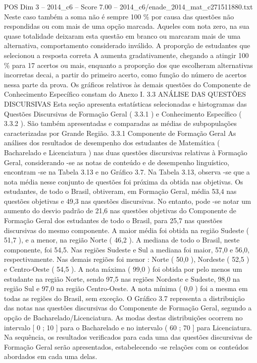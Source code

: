 \begin{textsample}{POS Dim 3 – 2014\_c6 – Score 7.00 – 2014\_c6/enade\_2014\_mat\_c271511880.txt}
Neste caso também a soma não é sempre 100 \% por causa das questões não respondidas ou com mais de uma opção marcada.
Aqueles com nota zero, na sua quase totalidade deixaram esta questão em branco ou marcaram mais de uma alternativa, comportamento considerado inválido.
A proporção de estudantes que selecionou a resposta correta A aumenta gradativamente, chegando a atingir 100 \% para 17 acertos ou mais, enquanto a proporção dos que escolheram alternativas incorretas decai, a partir do primeiro acerto, como função do número de acertos nessa parte da prova.
Os gráficos relativos às demais questões do Componente de Conhecimento Específico constam do Anexo I. 3.3 ANÁLISE DAS QUESTÕES DISCURSIVAS Esta seção apresenta estatísticas selecionadas e histogramas das Questões Discursivas de Formação Geral ( 3.3.1 ) e Conhecimento Específico ( 3.3.2 ).
São também apresentadas e comparadas as médias de subpopulações caracterizadas por Grande Região. 3.3.1 Componente de Formação Geral As análises dos resultados de desempenho dos estudantes de Matemática ( Bacharelado e Licenciatura ) nas duas questões discursivas relativas à Formação Geral, considerando -se as notas de conteúdo e de desempenho linguístico, encontram -se na Tabela 3.13 e no Gráfico 3.7.
Na Tabela 3.13, observa -se que a nota média nesse conjunto de questões foi próxima da obtida nas objetivas.
Os estudantes, de todo o Brasil, obtiveram, em Formação Geral, média 53,4 nas questões objetivas e 49,3 nas questões discursivas.
No entanto, pode -se notar um aumento do desvio padrão de 21,6 nas questões objetivas do Componente de Formação Geral dos estudantes de todo o Brasil, para 25,7 nas questões discursivas do mesmo componente.
A maior média foi obtida na região Sudeste ( 51,7 ), e a menor, na região Norte ( 46,2 ).
A mediana de todo o Brasil, neste componente, foi 54,5.
Nas regiões Sudeste e Sul a mediana foi maior, 57,0 e 56,0, respectivamente.
Nas demais regiões foi menor : Norte ( 50,0 ), Nordeste ( 52,5 ) e Centro-Oeste ( 54,5 ).
A nota máxima ( 99,0 ) foi obtida por pelo menos um estudante na região Norte, sendo 97,5 nas regiões Nordeste e Sudeste, 98,0 na região Sul e 97,0 na região Centro-Oeste.
A nota mínima ( 0,0 ) foi a mesma em todas as regiões do Brasil, sem exceção.
O Gráfico 3.7 representa a distribuição das notas nas questões discursivas do Componente de Formação Geral, segundo a opção de Bacharelado/Licenciatura.
As modas destas distribuições ocorrem no intervalo [ 0 ; 10 ] para o Bacharelado e no intervalo ( 60 ; 70 ] para Licenciatura.
Na sequência, os resultados verificados para cada uma das questões discursivas de Formação Geral serão apresentados, estabelecendo -se relações com os conteúdos abordados em cada uma delas.

\end{textsample}

